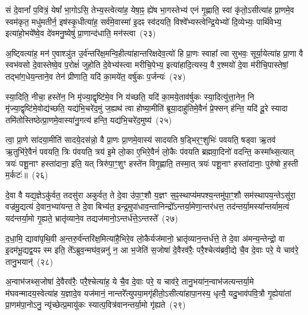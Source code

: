 सं दे॒वानां᳚ प॒वित्रं॒ येषां᳚ भा॒गो\-ऽसि॒ तेभ्य॒स्त्वेत्या॑ह॒ येषा॒ꣴ॒ ह्ये॑ष भा॒गस्तेभ्य॑ एनं गृ॒ह्णाति॒ स्वां कृ॑तो॒\-ऽसीत्या॑ह प्रा॒णमे॒व स्वम॑कृत॒ मधु॑मतीर्न॒ इष॑स्कृ॒धीत्या॑ह॒ सर्व॑मे॒वास्मा॑ इ॒दꣴ स्व॑दयति॒ विश्वे᳚भ्यस्त्वेन्द्रि॒येभ्यो॑ दि॒व्येभ्यः॒ पार्थि॑वेभ्य॒ इत्या॑हो॒भये᳚ष्वे॒व दे॑वमनु॒ष्येषु॑ प्रा॒णान्द॑धाति॒ मन॑स्त्वा~(२३)

अ॒ष्ट्वित्या॑ह॒ मन॑ ए॒वाश्ञु॑त उ॒र्व॑न्तरि॑क्ष॒मन्वि॒हीत्या॑हान्तरिक्षदेव॒त्यो॑ हि प्रा॒णः स्वाहा᳚ त्वा सुभवः॒ सूर्या॒येत्या॑ह प्रा॒णा वै स्वभ॑वसो दे॒वास्तेष्वे॒व प॒रोक्षं॑ जुहोति दे॒वेभ्य॑स्त्वा मरीचि॒पेभ्य॒ इत्या॑हादि॒त्यस्य॒ वै र॒श्मयो॑ दे॒वा म॑रीचि॒पास्तेषां॒ तद्भा॑ग॒धेय॒न्ताने॒व तेन॑ प्रीणाति॒ यदि॑ का॒मये॑त॒ वर्\mbox{}षु॑कः प॒र्जन्यः॑~(२४)

स्या॒दिति॒ नीचा॒ हस्ते॑न॒ नि मृ॑ज्या॒द्वृष्टि॑मे॒व नि य॑च्छति॒ यदि॑ का॒मये॒ताव॑र्\mbox{}षुकः स्या॒दित्यु॑त्ता॒नेन॒ नि मृ॑ज्या॒द्वृष्टि॑मे॒वोद्य॑च्छति॒ यद्य॑भि॒चरे॑द॒मुं ज॒ह्यथ॑ त्वा होष्या॒मीति॑ ब्रूया॒दाहु॑तिमे॒वैनं॑ प्रे॒फ्सन् ह॑न्ति॒ यदि॑ दू॒रे स्यादा तमि॑तोस्तिष्ठेत्प्रा॒णमे॒वास्या॑नु॒गत्य॑ हन्ति॒ यद्य॑भि॒चरे॑द॒मुष्य॑~(२५)

त्वा॒ प्रा॒णे सा॑दया॒मीति॑ सादये॒दस॑न्नो॒ वै प्रा॒णः प्रा॒णमे॒वास्य॑ सादयति ष॒ड्भिर॒ꣳ॒शुभिः॑ पवयति॒ षड्वा ऋ॒तव॑ ऋ॒तुभि॑रे॒वैनं॑ पवयति॒ त्रिः प॑वयति॒ त्रय॑ इ॒मे लो॒का ए॒भिरे॒वैनं॑ लो॒कैः प॑वयति ब्रह्मवा॒दिनो॑ वदन्ति॒ कस्मा᳚थ्स॒त्यात् त्रयः॑ पशू॒नाꣳ हस्ता॑दाना॒ इति॒ यत् त्रिरु॑पा॒ꣳ॒शुꣳ हस्ते॑न विगृ॒ह्णाति॒ तस्मा॒त् त्रयः॑ पशू॒नाꣳ हस्ता॑दानाः॒ पुरु॑षो ह॒स्ती म॒र्कटः॑॥~(२६)

{\anuvakamend[{माध्य॑न्दिनम॒ष्टाव॑ष्टावे॒ष मन॑स्त्वा प॒र्जन्यो॒\-ऽमुष्य॒ पुरु॑षो॒ द्वे च॑}]}%

दे॒वा वै यद्य॒ज्ञे\-ऽकु॑र्वत॒ तदसु॑रा अकुर्वत॒ ते दे॒वा उ॑पा॒ꣳ॒शौ य॒ज्ञꣳ स॒ꣴ॒स्थाप्य॑मपश्य॒न्तमु॑पा॒ꣳ॒शौ सम॑स्थापय॒न्ते\-ऽसु॑रा॒ वज्र॑मु॒द्यत्य॑ दे॒वान॒भ्या॑यन्त॒ ते दे॒वा बिभ्य॑त॒ इन्द्र॒मुपा॑धाव॒न्तानिन्द्रो᳚\-ऽन्तर्या॒मेणा॒न्तर॑धत्त॒ तद॑न्तर्या॒मस्या᳚न्तर्याम॒त्वं यद॑न्तर्या॒मो गृ॒ह्यते॒ भ्रातृ॑व्याने॒व तद्यज॑मानो॒\-ऽन्तर्ध॑त्ते॒\-ऽन्तस्ते᳚~(२७)

द॒धा॒मि॒ द्यावा॑\-पृथि॒वी अ॒न्तरु॒र्व॑न्तरि॑क्ष॒मित्या॑है॒भिरे॒व लो॒कैर्यज॑मानो॒ भ्रातृ॑व्यान॒न्तर्ध॑त्ते॒ ते दे॒वा अ॑मन्य॒न्तेन्द्रो॒ वा इ॒दम॑भू॒द्यद्व॒यꣴ स्म इति॒ ते᳚\-ऽब्रुव॒न्मघ॑व॒न्ननु॑ न॒ आ भ॒जेति॑ स॒जोषा॑ दे॒वैरव॑रैः॒ परै॒श्चेत्य॑ब्रवी॒द्ये चै॒व दे॒वाः परे॒ ये चाव॑रे॒ तानु॒भयान्॑~(२८)

अ॒न्वाभ॑जथ्स॒जोषा॑ दे॒वैरव॑रैः॒ परै॒श्चेत्या॑ह॒ ये चै॒व दे॒वाः परे॒ य चाव॑रे॒ तानु॒भया॑न॒न्वाभ॑जत्यन्तर्या॒मे म॑घवन्मादय॒स्वेत्या॑ह य॒ज्ञादे॒व यज॑मानं॒ नान्तरे᳚त्युपया॒मगृ॑हीतो॒\-ऽसीत्या॑हापा॒नस्य॒ धृत्यै॒ यदु॒भाव॑पवि॒त्रौ गृ॒ह्येया॑तां प्रा॒णम॑पा॒नो\-ऽनु॒ न्यृ॑च्छेत्प्र॒मायु॑कः स्यात्प॒वित्र॑वानन्तर्या॒मो गृ॑ह्यते~(२९)

